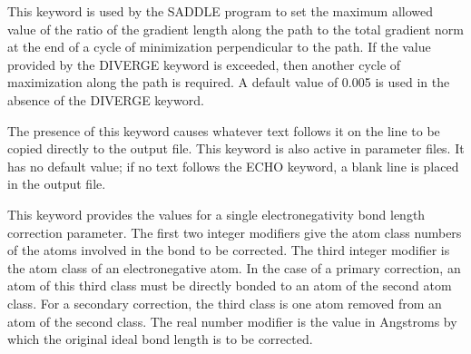 \documentclass[letterpaper,11pt,english]{sphinxmanual}
\begin{document}










  This keyword is used by the SADDLE program to set the maximum allowed value of the ratio of the gradient length along the path to the total gradient norm at the end of a cycle of minimization perpendicular to the path. If the value provided by the DIVERGE keyword is exceeded, then another cycle of maximization along the path is required. A default value of 0.005 is used in the absence of the DIVERGE keyword.



  The presence of this keyword causes whatever text follows it on the line to be copied directly to the output file. This keyword is also active in parameter files. It has no default value; if no text follows the ECHO keyword, a blank line is placed in the output file.


  This keyword provides the values for a single electronegativity bond length correction parameter. The first two integer modifiers give the atom class numbers of the atoms involved in the bond to be corrected. The third integer modifier is the atom class of an electronegative atom. In the case of a primary correction, an atom of this third class must be directly bonded to an atom of the second atom class. For a secondary correction, the third class is one atom removed from an atom of the second class. The real number modifier is the value in Angstroms by which the original ideal bond length is to be corrected.
\end{document}
